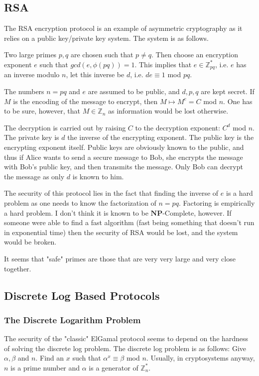 \documentclass[12pt,a4paper]{article}
\begin{document}
\subsection{RSA}
The RSA encryption protocol is an example of asymmetric cryptography as it relies on a public key/private key system. The system is as follows.

Two large primes $p, q$ are chosen such that $p \not = q$. Then choose an encryption exponent $e$ such that $gcd(e, \phi(pq)) = 1$. This implies that $e \in \mathbb{Z}_{pq}^{\ast}$, i.e. $e$ has an inverse modulo $n$, let this inverse be $d$, i.e. $de \equiv 1$ mod $pq$.

 The numbers $n = pq$ and $e$ are assumed to be public, and $d, p, q$ are kept secret. If $M$ is the encoding of the message to encrypt, then $M \mapsto M^{e} = C$ mod $n$. One has to be sure, however, that $M \in \mathbb{Z}_{n}$ as information would be lost otherwise. 

The decryption is carried out by raising $C$ to the decryption exponent: $C^{d}$ mod $n$. The private key is $d$ the inverse of the encrypting exponent. The public key is the encrypting exponent itself. Public keys are obviously known to the public, and thus if Alice wants to send a secure message to Bob, she encrypts the message with Bob's public key, and then transmits the message. Only Bob can decrypt the message as only $d$ is known to him. 

The security of this protocol lies in the fact that finding the inverse of $e$ is a hard problem as one needs to know the factorization of $n = pq$. Factoring is empirically a hard problem. I don't think it is known to be $\textbf{NP}$-Complete, however. If someone were able to find a fast algorithm (fast being something that doesn't run in exponential time) then the security of RSA would be lost, and the system would be broken. 

It seems that "safe" primes are those that are very very large and very close together. 

\subsection{Discrete Log Based Protocols}
\subsubsection{The Discrete Logarithm Problem}
The security of the "classic" ElGamal protocol seems to depend on the hardness of solving the discrete log problem. The discrete log problem is as follows:
Give $\alpha, \beta$ and $n$. Find an $x$ such that $\alpha^{x} \equiv \beta$ mod $n$. Usually, in cryptosystems anyway, $n$ is a prime number and $\alpha$ is a generator of $\mathbb{Z}_{n}^{\ast}$. 
\end{document}
